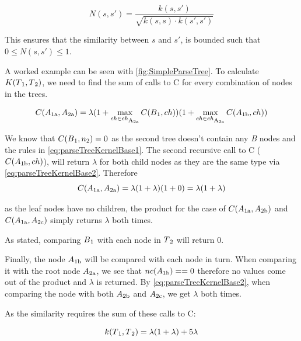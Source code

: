 \begin{equation}\label{eq:normalise}
N(s,s') = \frac{k(s, s')}{\sqrt{k(s, s) \cdot k(s', s')}}
\end{equation}

This ensures that the similarity between $s$ and $s'$, is bounded such that 
$0 \le N(s, s') \le 1$.

A worked example can be seen with \cref{fig:SimpleParseTree}. To calculate
$K(T\textsubscript{1}, T\textsubscript{2})$, we need to find the sum of
calls to C for every combination of nodes in the trees.

\begin{equation}
C(A\textsubscript{1a}, A\textsubscript{2a}) = 
\lambda(1+\max_{ch\in ch\textsubscript{A\textsubscript{2a}}}{C(B\textsubscript{1}, ch)})
(1+\max_{ch\in ch\textsubscript{A\textsubscript{2a}}}{C(A\textsubscript{1b}, ch)})
\end{equation}

We know that $C(B\textsubscript{1}, n\textsubscript{2}) = 0$ as the second tree
doesn't contain any \emph{B} nodes and the rules in \cref{eq:parseTreeKernelBase1}. 
The second recursive call to C 
($C(A\textsubscript{1b}, ch)$), will return $\lambda$ for both child nodes as
they are the same type via \cref{eq:parseTreeKernelBase2}. Therefore 
\begin{equation}
C(A\textsubscript{1a}, A\textsubscript{2a}) = \lambda(1+\lambda)(1+0)
= \lambda(1+\lambda)
\end{equation}

as the leaf nodes have no children, the product for the case of 
$C(A\textsubscript{1a}, A\textsubscript{2b})$ and $C(A\textsubscript{1a}, A\textsubscript{2c})$ 
simply returns $\lambda$ both times.

As stated, comparing $B\textsubscript{1}$ with each node in $T\textsubscript{2}$ will
return 0.

Finally, the node $A\textsubscript{1b}$ will be compared with each node in turn.
When comparing it with the root node $A\textsubscript{2a}$, we see that 
$nc(A\textsubscript{1b}) == 0$ therefore no values come out of the product and
$\lambda$ is returned. By \cref{eq:parseTreeKernelBase2}, when comparing the
node with both $A\textsubscript{2b}$ and $A\textsubscript{2c}$, we get $\lambda$
both times.

As the similarity requires the sum of these calls to C:

\begin{equation}
k(T\textsubscript{1}, T\textsubscript{2}) = \lambda(1+\lambda) + 5\lambda
\end{equation}

